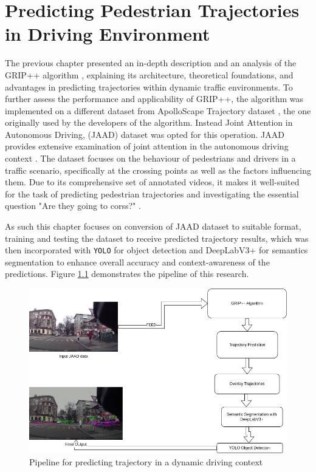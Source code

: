 \chapter{Predicting Pedestrian Trajectories in Driving Environment}

\tab The previous chapter presented an in-depth description and an analysis of the GRIP++ algorithm \cite{li2020gripplus}, explaining its architecture, theoretical foundations, and advantages in predicting trajectories within dynamic traffic environments. To further assess the performance and applicability of GRIP++, the algorithm was implemented on a different dataset from ApolloScape Trajectory dataset \cite{ma2019trafficpredict}, the one originally used by the developers of the algorithm. Instead Joint Attention in Autonomous Driving, (JAAD) \cite{rasouli2017ICCVW} dataset was opted for this operation. JAAD provides extensive examination of joint attention in the autonomous driving context \cite{rasouli2017ICCVW}. The dataset focuses on the behaviour of pedestrians and drivers in a traffic scenario, specifically at the crossing points as well as the factors influencing them. Due to its comprehensive set of annotated videos, it makes it well-suited for the task of predicting pedestrian trajectories and investigating the essential question "Are they going to corss?" \cite{rasouli2017ICCVW}. 

\tab As such this chapter focuses on conversion of JAAD dataset to suitable format, training and testing the dataset to receive predicted trajectory results, which was then incorporated with \verb|YOLO| \cite{yolov3} for object detection and DeepLabV3+ \cite{DBLP:journals/corr/abs-1802-02611} for semantics segmentation to enhance overall accuracy and context-awareness of the predictions. Figure \ref{fig:pipeline} demonstrates the pipeline of this research.

\begin{figure}[h]
  \begin{center}
     \includegraphics[scale=0.5]{Images/Figures/Pipeline.png}
  \end{center}
  \caption{Pipeline for predicting trajectory in a dynamic driving context}
  \label{fig:pipeline}
\end{figure}

